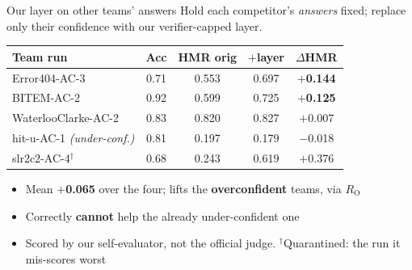 \documentclass[aspectratio=169,11pt]{beamer}
\newcommand{\HMR}{\textsc{HMR}}
\newcommand{\RO}{R_{\mathrm{O}}}
\newcommand{\gd}[1]{{\color{good}\textbf{#1}}}
\begin{document}
\begin{frame}{Our layer on other teams' answers}
\centering\vspace{0.2em}
{\small Hold each competitor's \emph{answers} fixed; replace only their confidence
with our verifier-capped layer.}
\vspace{0.6em}

\begin{tabular}{lcccc}
\toprule
Team run & Acc & \HMR{} orig & $+$layer & $\Delta$\HMR\\
\midrule
Error404-AC-3 & 0.71 & 0.553 & 0.697 & \gd{$+$0.144}\\
BITEM-AC-2 & 0.92 & 0.599 & 0.725 & \gd{$+$0.125}\\
WaterlooClarke-AC-2 & 0.83 & 0.820 & 0.827 & $+$0.007\\
hit-u-AC-1 \emph{(under-conf.)} & 0.81 & 0.197 & 0.179 & $-$0.018\\
\midrule
\color{gray}slr2c2-AC-4$^\dagger$ & \color{gray}0.68 & \color{gray}0.243 & \color{gray}0.619 & \color{gray}$+$0.376\\
\bottomrule
\end{tabular}

\vspace{0.8em}
\begin{itemize}
  \item Mean \textbf{$+$0.065} over the four; lifts the \textbf{overconfident} teams, via $\RO$
  \item Correctly \textbf{cannot} help the already under-confident one
  \item {\small Scored by our self-evaluator, not the official judge.
        $^\dagger$Quarantined: the run it mis-scores worst}
\end{itemize}
\end{frame}
\end{document}
